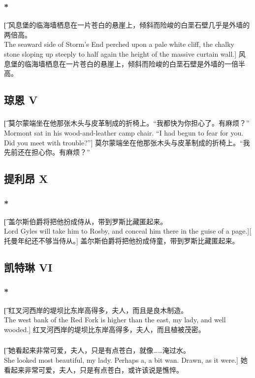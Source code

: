 \documentclass[12pt,a4paper]{article}
\begin{document}
\subsubsection{\color{red}*}\t[
	风息堡的临海墙栖息在一片苍白的悬崖上，倾斜而险峻的白垩石壁几乎是外墙的两倍高。\\
	The seaward side of Storm's End perched upon a pale white cliff, the chalky stone sloping up steeply to half again the height of the massive curtain wall.]
	风息堡的临海墙栖息在一片苍白的悬崖上，倾斜而险峻的白垩石壁是外墙的一倍半高。
	
\subsection{琼恩 V}
\subsubsection{}\t[
	莫尔蒙端坐在他那张木头与皮革制成的折椅上。“我都快为你担心了。有麻烦？”\\
	Mormont sat in his wood-and-leather camp chair. “I had begun to fear for you. Did you meet with trouble?”]	
	莫尔蒙端坐在他那张木头与皮革制成的折椅上。“我先前还在担心你。有麻烦？”

\subsection{提利昂 X}
\subsubsection{\color{red}*}\t[
	盖尔斯伯爵将把他扮成侍从，带到罗斯比藏匿起来。\\
	Lord Gyles will take him to Rosby, and conceal him there in the guise of a page.][
	托曼年纪还不够当侍从。]
	盖尔斯伯爵将把他扮成侍童，带到罗斯比藏匿起来。
	

\subsection{凯特琳 VI}
\subsubsection{\color{red}*}\t[
	红叉河西岸的堤坝比东岸高得多，夫人，而且是良木制造。\\
	The west bank of the Red Fork is higher than the east, my lady, and well wooded.]
	红叉河西岸的堤坝比东岸高得多，夫人，而且植被茂密。
	
\subsubsection{}\t[
	她看起来非常可爱，夫人，只是有点苍白，就像……淹过水。\\
	She looked most beautiful, my lady. Perhaps a, a bit wan. Drawn, as it were.]
	她看起来非常可爱，夫人，只是有点苍白，或许该说是憔悴。
		
\end{document}
